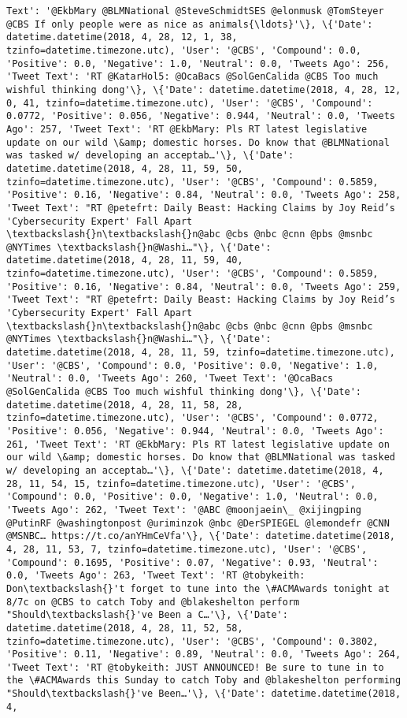 \documentclass[11pt]{article}
\begin{document}
\begin{Verbatim}[commandchars=\\\{\}]
Text': '@EkbMary @BLMNational @SteveSchmidtSES @elonmusk @TomSteyer @CBS If only people were as nice as animals{\ldots}'\}, \{'Date': datetime.datetime(2018, 4, 28, 12, 1, 38, tzinfo=datetime.timezone.utc), 'User': '@CBS', 'Compound': 0.0, 'Positive': 0.0, 'Negative': 1.0, 'Neutral': 0.0, 'Tweets Ago': 256, 'Tweet Text': 'RT @KatarHol5: @OcaBacs @SolGenCalida @CBS Too much wishful thinking dong'\}, \{'Date': datetime.datetime(2018, 4, 28, 12, 0, 41, tzinfo=datetime.timezone.utc), 'User': '@CBS', 'Compound': 0.0772, 'Positive': 0.056, 'Negative': 0.944, 'Neutral': 0.0, 'Tweets Ago': 257, 'Tweet Text': 'RT @EkbMary: Pls RT latest legislative update on our wild \&amp; domestic horses. Do know that @BLMNational was tasked w/ developing an acceptab…'\}, \{'Date': datetime.datetime(2018, 4, 28, 11, 59, 50, tzinfo=datetime.timezone.utc), 'User': '@CBS', 'Compound': 0.5859, 'Positive': 0.16, 'Negative': 0.84, 'Neutral': 0.0, 'Tweets Ago': 258, 'Tweet Text': "RT @petefrt: Daily Beast: Hacking Claims by Joy Reid’s 'Cybersecurity Expert' Fall Apart \textbackslash{}n\textbackslash{}n@abc @cbs @nbc @cnn @pbs @msnbc @NYTimes \textbackslash{}n@Washi…"\}, \{'Date': datetime.datetime(2018, 4, 28, 11, 59, 40, tzinfo=datetime.timezone.utc), 'User': '@CBS', 'Compound': 0.5859, 'Positive': 0.16, 'Negative': 0.84, 'Neutral': 0.0, 'Tweets Ago': 259, 'Tweet Text': "RT @petefrt: Daily Beast: Hacking Claims by Joy Reid’s 'Cybersecurity Expert' Fall Apart \textbackslash{}n\textbackslash{}n@abc @cbs @nbc @cnn @pbs @msnbc @NYTimes \textbackslash{}n@Washi…"\}, \{'Date': datetime.datetime(2018, 4, 28, 11, 59, tzinfo=datetime.timezone.utc), 'User': '@CBS', 'Compound': 0.0, 'Positive': 0.0, 'Negative': 1.0, 'Neutral': 0.0, 'Tweets Ago': 260, 'Tweet Text': '@OcaBacs @SolGenCalida @CBS Too much wishful thinking dong'\}, \{'Date': datetime.datetime(2018, 4, 28, 11, 58, 28, tzinfo=datetime.timezone.utc), 'User': '@CBS', 'Compound': 0.0772, 'Positive': 0.056, 'Negative': 0.944, 'Neutral': 0.0, 'Tweets Ago': 261, 'Tweet Text': 'RT @EkbMary: Pls RT latest legislative update on our wild \&amp; domestic horses. Do know that @BLMNational was tasked w/ developing an acceptab…'\}, \{'Date': datetime.datetime(2018, 4, 28, 11, 54, 15, tzinfo=datetime.timezone.utc), 'User': '@CBS', 'Compound': 0.0, 'Positive': 0.0, 'Negative': 1.0, 'Neutral': 0.0, 'Tweets Ago': 262, 'Tweet Text': '@ABC @moonjaein\_ @xijingping @PutinRF @washingtonpost @uriminzok @nbc @DerSPIEGEL @lemondefr @CNN @MSNBC… https://t.co/anYHmCeVfa'\}, \{'Date': datetime.datetime(2018, 4, 28, 11, 53, 7, tzinfo=datetime.timezone.utc), 'User': '@CBS', 'Compound': 0.1695, 'Positive': 0.07, 'Negative': 0.93, 'Neutral': 0.0, 'Tweets Ago': 263, 'Tweet Text': 'RT @tobykeith: Don\textbackslash{}'t forget to tune into the \#ACMAwards tonight at 8/7c on @CBS to catch Toby and @blakeshelton perform "Should\textbackslash{}'ve Been a C…'\}, \{'Date': datetime.datetime(2018, 4, 28, 11, 52, 58, tzinfo=datetime.timezone.utc), 'User': '@CBS', 'Compound': 0.3802, 'Positive': 0.11, 'Negative': 0.89, 'Neutral': 0.0, 'Tweets Ago': 264, 'Tweet Text': 'RT @tobykeith: JUST ANNOUNCED! Be sure to tune in to the \#ACMAwards this Sunday to catch Toby and @blakeshelton performing "Should\textbackslash{}'ve Been…'\}, \{'Date': datetime.datetime(2018, 4, 
\end{Verbatim}
\end{document}
